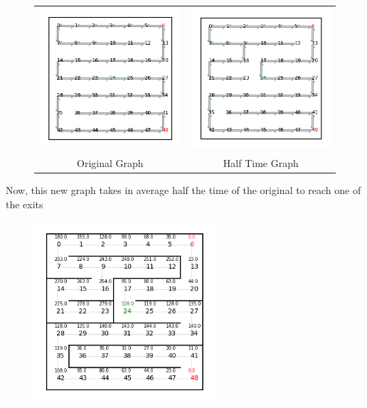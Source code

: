 \begin{figure}[H]
    \begin{tabular}{cc}
      \includegraphics[width=70mm]{../pictures/216-4.png} &   \includegraphics[width=70mm]{../pictures/108-4.png} \\
    Original Graph & Half Time Graph \\[6pt]
    \end{tabular}
\end{figure}

Now, this new graph takes in average half the time of the original to reach one of the exits

\begin{figure}[H]
    \centering
    \includegraphics[width=0.6\textwidth]{../pictures/108-2.png}
\end{figure}
